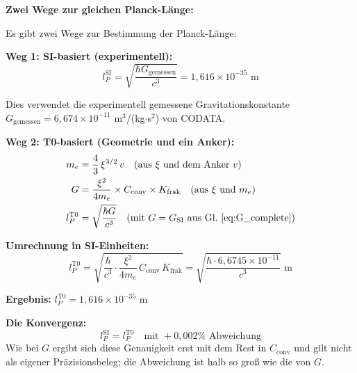 	\begin{historical}
		\textbf{Zwei Wege zur gleichen Planck-Länge:}
		
		Es gibt zwei Wege zur Bestimmung der Planck-Länge:
		
		\textbf{Weg 1: SI-basiert (experimentell):}
		\begin{equation}
			l_P^{\text{SI}} = \sqrt{\frac{\hbar G_{\text{gemessen}}}{c^3}} = 1{,}616 \times 10^{-35} \text{ m}
		\end{equation}
		
		Dies verwendet die experimentell gemessene Gravitationskonstante $G_{\text{gemessen}} = 6{,}674 \times 10^{-11}$ m$^3$/(kg$\cdot$s$^2$) von CODATA.
		
		\textbf{Weg 2: T0-basiert (Geometrie und ein Anker):}
		\begin{align}
			m_e &= \frac{4}{3}\,\xi^{3/2}\,v \quad \text{(aus } \xi \text{ und dem Anker } v\text{)} \\
			G &= \frac{\xi^2}{4m_e} \times C_{\text{conv}} \times K_{\text{frak}} \quad \text{(aus } \xi \text{ und } m_e\text{)} \\
			l_P^{\text{T0}} &= \sqrt{\frac{\hbar G}{c^3}} \quad \text{(mit } G = G_{\text{SI}} \text{ aus Gl.~\eqref{eq:G_complete})}
		\end{align}
		
		\textbf{Umrechnung in SI-Einheiten:}
		\begin{equation}
			l_P^{\text{T0}} = \sqrt{\frac{\hbar}{c^3} \cdot \frac{\xi^2}{4m_e} \, C_{\text{conv}} \, K_{\text{frak}}} = \sqrt{\frac{\hbar \cdot 6{,}6745 \times 10^{-11}}{c^3}} \text{ m}
		\end{equation}
		
		\textbf{Ergebnis:} $l_P^{\text{T0}} = 1{,}616 \times 10^{-35}$ m
		
		\textbf{Die Konvergenz:}
		\begin{equation}
			\boxed{l_P^{\text{SI}} = l_P^{\text{T0}} \quad \text{mit } +0{,}002\% \text{ Abweichung}}
		\end{equation}
		Wie bei $G$ ergibt sich diese Genauigkeit erst mit dem Rest in $C_{\text{conv}}$ und gilt nicht als eigener Präzisionsbeleg; die Abweichung ist halb so groß wie die von $G$.
		
	\end{historical}
	
